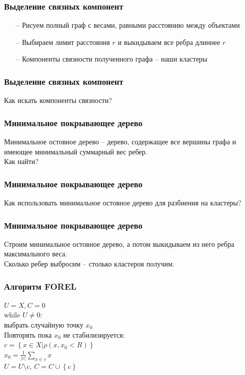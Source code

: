 \documentclass[12pt]{beamer}
\begin{document}
\begin{frame}\frametitle{Выделение связных компонент}
\begin{itemize}
\item[--] Рисуем полный граф с весами, равными расстоянию между объектами
\item[--] Выбираем лимит расстояния $r$ и выкидываем все ребра длиннее $r$
\item[--] Компоненты связности полученного графа -- наши кластеры
\end{itemize}
\end{frame}

\begin{frame}\frametitle{Выделение связных компонент}
Как искать компоненты связности?
\end{frame}

\begin{frame}\frametitle{Минимальное покрывающее дерево}
Минимальное остовное дерево -- дерево, содержащее все вершины графа и имеющее минимальный суммарный вес ребер.\\
\vspace{5mm}
Как найти?
\end{frame}

\begin{frame}\frametitle{Минимальное покрывающее дерево}
Как использовать минимальное остовное дерево для разбиения на кластеры?
\end{frame}
\begin{frame}\frametitle{Минимальное покрывающее дерево}
Строим минимальное остовное дерево, а потом выкидываем из него ребра максимального веса.\\
\vspace{5mm}
Сколько ребер выбросим -- столько кластеров получим.
\end{frame}

\begin{frame}\frametitle{Алгоритм FOREL}

${U = X, C = 0}$\\\vspace{2mm}
while ${U \neq 0}$:\\
\hspace{5mm} выбрать случайную точку $x_0$\\
\vspace{2mm}
\hspace{5mm} Повторять пока $x_0$ не стабилизируется:\\
\vspace{2mm}
\hspace{10mm} ${c = \left\{ x \in X \vert \rho(x, x_0 < R) \right\}}$ \\
\vspace{2mm}
\hspace{10mm} $x_0 = \frac{1}{\vert c \vert} \sum_{x \in c} x$\\
\vspace{2mm}
\hspace{5mm} ${U = U \setminus c}$, ${C = C \cup \left\{ c \right\}}$
\end{frame}
\end{document}
